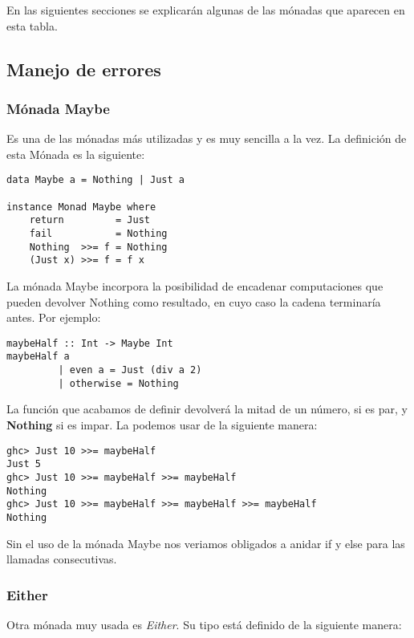 En las siguientes secciones se explicarán algunas de las mónadas que aparecen
en esta tabla.


\subsection{Manejo de errores} %
\label{sub:manejo_de_errores}


\subsubsection{Mónada Maybe} %
\label{ssub:m_nada_maybe}

Es una de las mónadas más utilizadas y es muy sencilla a la vez. La definición
de esta Mónada es la siguiente:

\begin{lstlisting}
data Maybe a = Nothing | Just a

instance Monad Maybe where
    return         = Just
    fail           = Nothing
    Nothing  >>= f = Nothing
    (Just x) >>= f = f x
\end{lstlisting}

La mónada Maybe incorpora la posibilidad de encadenar computaciones que pueden
devolver Nothing como resultado, en cuyo caso la cadena terminaría antes. Por ejemplo:

\begin{lstlisting}
maybeHalf :: Int -> Maybe Int
maybeHalf a
         | even a = Just (div a 2)
         | otherwise = Nothing
\end{lstlisting}

La función que acabamos de definir devolverá la mitad de un número, si es par, y \textbf{Nothing} si es impar. La podemos usar de la siguiente manera:

\begin{lstlisting}
ghc> Just 10 >>= maybeHalf
Just 5
ghc> Just 10 >>= maybeHalf >>= maybeHalf
Nothing
ghc> Just 10 >>= maybeHalf >>= maybeHalf >>= maybeHalf
Nothing
\end{lstlisting}

Sin el uso de la mónada Maybe nos veriamos obligados a anidar if y else para las llamadas consecutivas.

\subsubsection{Either} %
\label{ssub:either}

Otra mónada muy usada es \textit{Either}. Su tipo está definido de la
siguiente manera:

